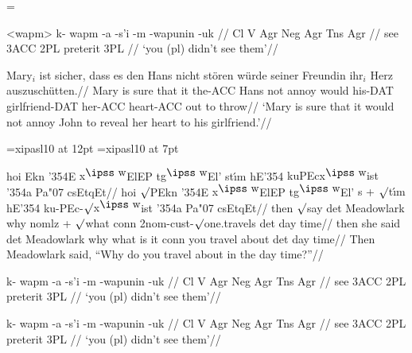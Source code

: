 
\def\small{\tenrm}
\def\suff#1{{-\small #1}}%
\everymath={}

\makeatletter
\def\glmw@printcolframed{%
   \psframebox[framesep=0]{\vtop{%
      \ling@everyglword
      \gl@loopmoretrue
      \loop\ifgl@loopmore
         \lop\tempa\to\@tempa
         \lop\aboveskiplist\to\@aboveskip
         \lop\strutlist\to\@strut
         \@aboveskip\hbox{\@strut\@tempa}%
         \ifx\tempa\empty \gl@loopmorefalse \fi
      \repeat
      }}%
}
\def\framewords{\let\glmw@printcol=\glmw@printcolframed}
\resetatcatcode

\ex<wapm>
\begingl
\gla k- wapm -a -s'i -m -wapunin -uk //
\glb Cl V Agr Neg Agr Tns Agr //
 see {3\sc ACC} {} 2{\sc PL} preterit 3{\sc PL} //
\glft `you (pl) didn't see them'//
\endgl
\xe

\ex
\begingl
\gla Mary$_i$ ist sicher, dass es den Hans nicht st\"oren w\"urde
seiner Freundin ihr$_i$ Herz auszusch\"utten.//
\glb Mary is sure that it the-{\sc ACC} Hans not annoy would
his-{\sc DAT} girlfriend-{\sc DAT} her-{\sc ACC} heart-{\sc ACC} {out to
throw}//
\glft  `Mary is sure that it would not annoy John to reveal her
heart to his girlfriend.'//
\endgl
\xe

\font\ips=xipasl10 at 12pt
\font\ipss=xipasl10 at 7pt
\def\mroot{$\surd$}
\def\L{\char'354}
\def\v#1{{\accent"07 #1}}
\def\C{{\accent"07 c}}
\def\W{$^{\hbox{\ipss w}}\mskip-2mu$}


\ex
\begingl
\gla[everygla=\ips] hoi Ekn {\L}E {x\W}ElEP t{g\W}El' st{\'\i}m {hE\L}
   {kuPEcx\W ist} {\L a} Pa{\v c}sEtqEt//
\glb[everyglb=\ips] hoi {\mroot}PEkn {\L}E {x\W}ElEP t{g\W}El' {s +
   \mroot t\'\i m} {hE\L} ku-PEc-\mroot{x\W}ist {\L}a Pa{\v c}sEtqEt//
\glb then {\mroot}say det Meadowlark why {nomlz + \mroot what} conn
   2nom-cust-{\mroot}one.travels det {day time}//
\glb then {she said} det Meadowlark why {what is it} conn {you travel
   about} det {day time}//
\glft Then Meadowlark said, ``Why do you travel about in the day
   time?''//
\endgl
\xe

\ex
\framewords
\begingl
\gla k- wapm -a -s'i -m -wapunin -uk //
\glb Cl V Agr Neg Agr Tns Agr //
 see {3\sc ACC} {} 2{\sc PL} preterit 3{\sc PL} //
\glft `you (pl) didn't see them'//
\endgl
\xe

\ex
\begingl
\gla[everygla=] k- wapm -a -s'i -m -wapunin -uk //
\glb[everyglb=\tenrm,aboveglbskip=-.5ex] Cl V Agr Neg Agr Tns Agr //
 see {3\sc ACC} {} 2{\sc PL} preterit 3{\sc PL} //
\glft `you (pl) didn't see them'//
\endgl
\xe


